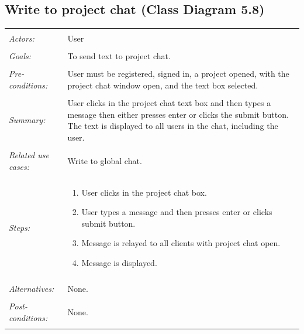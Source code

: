 \documentclass[11pt]{report}
\begin{document}
\subsection{Write to project chat (Class Diagram 5.8)}
\begin{tabular}{ p{2cm} p{12cm} }
 \hline
 \\
 \textit{Actors:} & User \\ 
 \\
 \textit{Goals:} & To send text to project chat. \\
 \\
 \textit{Pre-conditions:} & User must be registered, signed in, a project opened, with the project chat window open, and the text box selected.  \\
 \\
 \textit{Summary:} & User clicks in the project chat text box and then types a message then either presses enter or clicks the submit button. The text is displayed to all users in the chat, including the user. \\ 
 \\
 \textit{Related use cases:} & Write to global chat. \\ 
 \\
 \textit{Steps:} & \begin{enumerate}
  \item User clicks in the project chat box.
  \item User types a message and then presses enter or clicks submit button.
  \item Message is relayed to all clients with project chat open.
  \item Message is displayed.
 \end{enumerate} \\
 \\
 \textit{Alternatives:} & None. \\
 \\
 \textit{Post-conditions:} & None. \\
 \\
\hline
\end{tabular}
\end{document}
